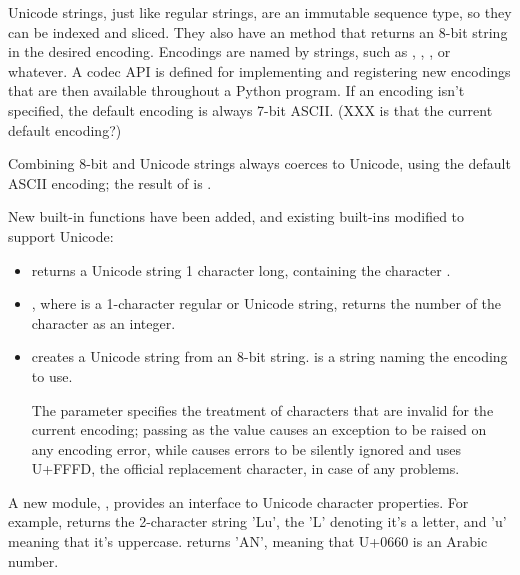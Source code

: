 \documentclass{howto}
\begin{document}
Unicode strings, just like regular strings, are an immutable sequence
type, so they can be indexed and sliced.  They also have an
 method that returns an 8-bit
string in the desired encoding.  Encodings are named by strings, such
as , , , or whatever.
A codec API is defined for implementing and registering new encodings
that are then available throughout a Python program.  If an encoding
isn't specified, the default encoding is always 7-bit ASCII.  (XXX is
that the current default encoding?)

Combining 8-bit and Unicode strings always coerces to Unicode, using
the default ASCII encoding; the result of  is
.

New built-in functions have been added, and existing built-ins
modified to support Unicode:

\begin{itemize}
\item {} returns a Unicode string 1 character
long, containing the character .

\item {}, where  is a 1-character regular or Unicode string, returns the number of the character as an integer.

\item {} creates a Unicode string from an 8-bit
string.   is a string naming the encoding to use.

The  parameter specifies the treatment of characters that
are invalid for the current encoding; passing  as the
value causes an exception to be raised on any encoding error, while
 causes errors to be silently ignored and
 uses U+FFFD, the official replacement character, in
case of any problems.

\end{itemize}

A new module, , provides an interface to Unicode
character properties.  For example, 
returns the 2-character string 'Lu', the 'L' denoting it's a letter,
and 'u' meaning that it's uppercase.
 returns 'AN', meaning that U+0660 is
an Arabic number.
\end{document}
